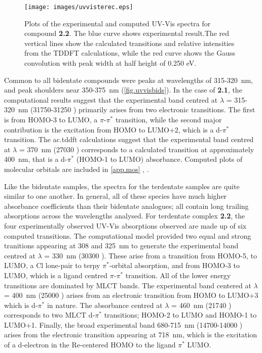 \begin{figure}[!htb]
 \centering
  \texttt{[image: images/uvvisterec.eps]}
 \caption[Plots of the experimental and computed UV-Vis spectra for compound \textbf{2.2}]{Plots of the experimental and computed UV-Vis spectra for compound \textbf{2.2}.  The blue curve shows experimental result.The red vertical lines show the calculated transitions and relative intensities from the TDDFT calculations, while the red curve shows the Gauss convolution with peak width at half height of 0.250 eV.}
 \label{fig.uvvisterec}
\end{figure}

Common to all bidentate compounds were peaks at wavelengths of 315-320~nm, and peak shoulders near 350-375~nm (\autoref{fig.uvvisbids}). In the case of \textbf{2.1}, the computational results suggest that the experimental band centred at $\lambda$ = 315-320~nm (31750-31250 ) primarily arises from two electronic transitions. The first is from HOMO-3 to LUMO, a $\pi$-$\pi^\ast$ transition, while the second major contribution is the excitation from HOMO to LUMO+2, which is a d-$\pi^\ast$ transition. The \gls{ac.tddft} calculations suggest that the experimental band centred at $\lambda$ = 370~nm (27030 ) corresponds to a calculated transition at approximately 400~nm, that is a d-$\pi^\ast$ (HOMO-1 to LUMO) absorbance. Computed plots of molecular orbitals are included in \autoref{app.mos} , .

Like the bidentate samples, the spectra for the terdentate samples are quite similar to one another. In general, all of these species have much higher absorbance coefficients than their bidentate analogues; all contain long trailing absorptions across the wavelengths analysed. For terdentate complex \textbf{2.2}, the four experimentally observed UV-Vis absorptions observed are made up of six computed transitions. The computational model provided two equal and strong tranitions appearing at 308 and 325~nm to generate the experimental band centred at $\lambda$ = 330~nm (30300 ). These arise from a transition from HOMO-5, to LUMO, a Cl lone-pair to terpy $\pi^\ast$-orbital absorption, and from HOMO-3 to LUMO, which is a ligand centred $\pi$-$\pi^\ast$ transition. All of the lower energy transitions are dominated by MLCT bands. The experimental band centered at $\lambda$ = 400~nm (25000 ) arises from an electronic transition from HOMO to LUMO+3 which is d-$\pi^\ast$ in nature. The absorbance centred at $\lambda$ = 460~nm (21740 ) corresponds to two MLCT d-$\pi^\ast$ transitions; HOMO-2 to LUMO and HOMO-1 to LUMO+1. Finally, the broad experimental band 680-715~nm (14700-14000 ) arises from the electronic transition appearing at 718~nm, which is the excitation of a d-electron in the Re-centered HOMO to the ligand $\pi^\ast$ LUMO.

